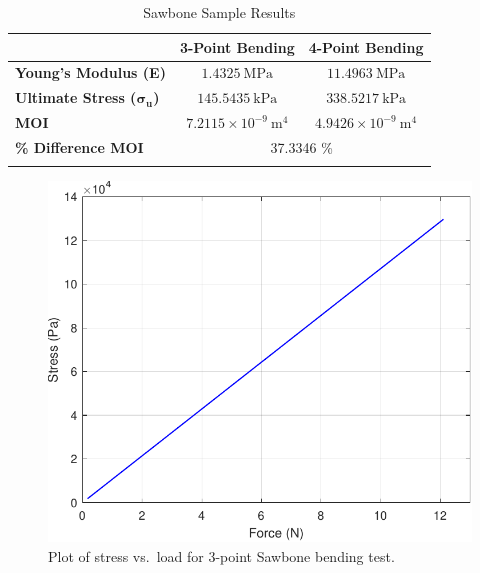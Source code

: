 \documentclass[conference, letterpaper]{IEEEtran}
\begin{document}
    \begin{table}[htbp]
        \caption{Sawbone Sample Results}
        \begin{minipage}{\linewidth}
            \centering
            \begin{tabular}{lcc}
                \toprule{}
                & \textbf{3-Point Bending} & \textbf{4-Point Bending} \\
                \midrule{}
                \hspace*{-1ex}\textbf{Young's Modulus (E)} & \(1.4325\ \text{MPa}\)  & \(11.4963\ \text{MPa}\)  \\
                \textbf{Ultimate Stress (\(\bm{\sigma_u}\))} & \(145.5435\ \text{kPa}\)  & \(338.5217\ \text{kPa}\)  \\
                \textbf{MOI} & \(7.2115\times10^{-9}\ \text{m}^4\)  & \(4.9426\times10^{-9}\ \text{m}^4\)  \\
                \midrule{}
                \hspace*{-1ex}\textbf{\% Difference MOI} & \multicolumn{2}{c}{37.3346 \%} \\
                \bottomrule{}
            \end{tabular}\label{tbl_1}
            \vspace*{-\baselineskip}
        \end{minipage}
    \end{table}
    \begin{figure}[htbp]
        \centerline{\includegraphics[width = 0.65\linewidth]{sawbones_sf.pdf}}
        \caption{Plot of stress vs.\ load for 3-point Sawbone bending test.}\label{sawbones_sf}
    \end{figure}
\end{document}
